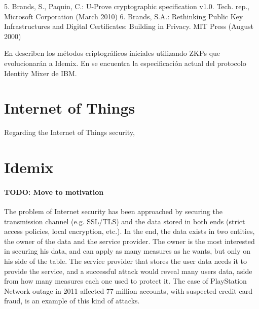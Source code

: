 5. Brands, S., Paquin, C.: U-Prove cryptographic specification v1.0. Tech. rep., Microsoft
Corporation (March 2010)
6. Brands, S.A.: Rethinking Public Key Infrastructures and Digital Certificates:
Building in Privacy. MIT Press (August 2000)






En \citep{Camenisch:GroupSig} \citep{Camenisch:AnonCred} \citep{camenisch2002signature} describen los métodos criptográficos iniciales utilizando ZKPs que evolucionarán a Idemix. En \citep{idemixSpec} se encuentra la especificación actual del protocolo Identity Mixer de IBM.

\section{Internet of Things}


Regarding the Internet of Things security, 


\section{Idemix}

\paragraph{TODO: Move to motivation}

The problem of Internet security has been approached by securing the transmission channel (e.g. SSL/TLS) and the data stored in both ends (strict access policies, local encryption, etc.). In the end, the data exists in two entities, the owner of the data and the service provider. The owner is the most interested in securing his data, and can apply as many measures as he wants, but only on his side of the table. The service provider that stores the user data needs it to provide the service, and a successful attack would reveal many users data, aside from how many measures each one used to protect it. The case of PlayStation Network outage in 2011 \citep{PSN2011} affected 77 million accounts, with suspected credit card fraud, is an example of this kind of attacks.

